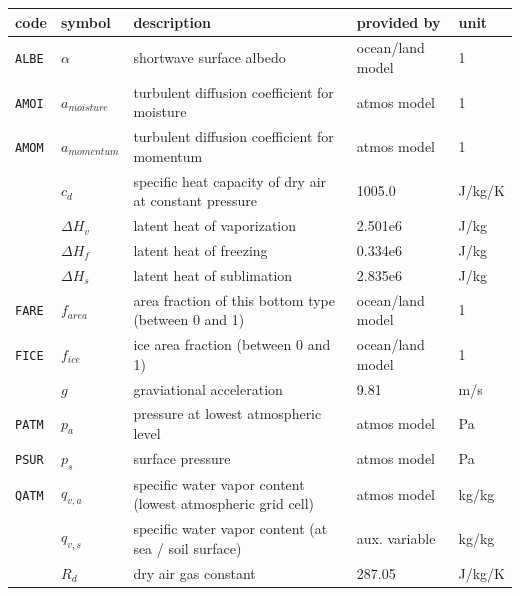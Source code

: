 \documentclass[a4paper,titlepage]{scrartcl}
\begin{document}
\small
\begin{tabular}{lllll}
  \hline \hline
  code & symbol & description & provided by & unit\\
  \hline
	\texttt{ALBE} & $\alpha$       & shortwave surface albedo                                              & ocean/land model & 1       \\
  \texttt{AMOI} & $a_{moisture}$ & turbulent diffusion coefficient for moisture                & atmos model      & 1       \\
  \texttt{AMOM} & $a_{momentum}$ & turbulent diffusion coefficient for momentum                & atmos model      & 1       \\
	              & $c_d$          & specific heat capacity of dry air at constant pressure      & 1005.0           & J/kg/K  \\
                & $\Delta H_v$   & latent heat of vaporization                                 & 2.501e6          & J/kg    \\
                & $\Delta H_f$   & latent heat of freezing                                     & 0.334e6          & J/kg    \\
                & $\Delta H_s$   & latent heat of sublimation                                  & 2.835e6          & J/kg    \\
	\texttt{FARE} & $f_{area}$     & area fraction of this bottom type (between 0 and 1)         & ocean/land model & 1       \\
	\texttt{FICE} & $f_{ice}$      & ice area fraction (between 0 and 1)                         & ocean/land model & 1       \\
                & $g$            & graviational acceleration                                   & 9.81             & m/s     \\
	\texttt{PATM} & $p_a$          & pressure at lowest atmospheric level                        & atmos model      & Pa      \\
  \texttt{PSUR} & $p_s$          & surface pressure                                            & atmos model      & Pa      \\
  \texttt{QATM} & $q_{v,a}$      & specific water vapor content (lowest atmospheric grid cell) & atmos model      & kg/kg   \\
                & $q_{v,s}$      & specific water vapor content (at sea / soil surface)        & aux. variable    & kg/kg   \\
                & $R_d$          & dry air gas constant                                        & 287.05           & J/kg/K  \\

\end{tabular}
\end{document}
